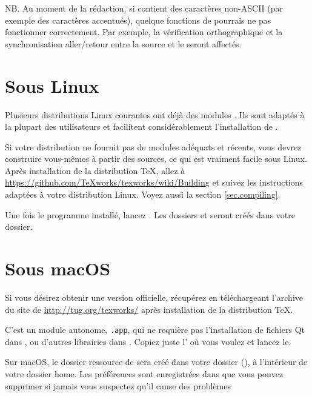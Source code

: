 NB. Au moment de la rédaction, si  contient des caractères non-ASCII (par exemple des caractères accentués), quelque fonctions de {\Tw} pourrais ne pas fonctionner correctement. Par exemple, la vérification orthographique et la synchronisation aller/retour entre la source et le  seront affectés.

\section{Sous Linux}

Plusieurs distributions Linux courantes ont déjà des modules \Tw. Ils sont adaptés à la plupart des utilisateurs et facilitent considérablement l'installation de \Tw.

Si votre distribution ne fournit pas de modules adéquats et récents, vous devrez construire vous-mêmes \Tw{} à partir des sources, ce qui est vraiment facile sous Linux. Après installation de la distribution \TeX, allez à \url{https://github.com/TeXworks/texworks/wiki/Building} et suivez les instructions adaptées à votre distribution Linux. Voyez aussi la section \ref{sec.compiling}.

Une fois le programme installé, lancez {\Tw}. Les dossiers  et  seront créés dans votre dossier.

\section{Sous macOS}

Si vous désirez obtenir une version \og officielle\fg{}, récupérez \Tw{} en téléchargeant l'archive du site de \Tw{} \url{http://tug.org/texworks/} après installation de la distribution {\TeX}.

C'est un module autonome, \texttt{.app}, qui ne requière pas l'installation de fichiers Qt dans , ou d'autres librairies dans . Copiez juste l' où vous voulez et lancez le.

Sur macOS, le dossier ressource de {\Tw}  sera créé dans votre dossier  (), à l'intérieur de votre dossier home. Les préférences sont enregistrées dans  
que vous pouvez supprimer si jamais vous suspectez qu'il cause des problèmes

